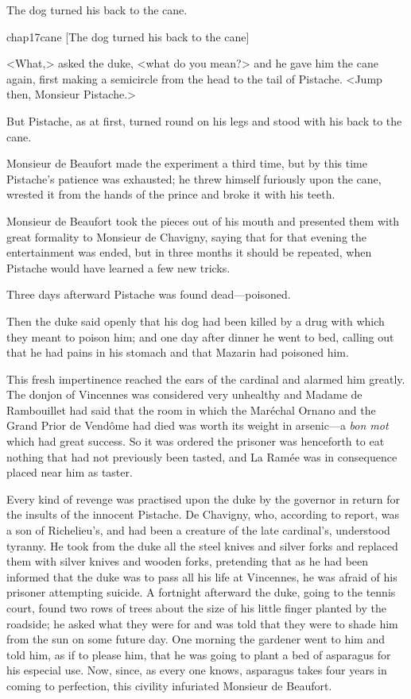 The dog turned his back to the cane.

\begin{bwbigpic}
	[\basicscale] 
	{chap17cane}
	[The dog turned his back to the cane]
\end{bwbigpic}

<What,> asked the duke, <what do you mean?> and he gave him the cane again, first making a semicircle from the head to the tail of Pistache. <Jump then, Monsieur Pistache.>

But Pistache, as at first, turned round on his legs and stood with his back to the cane.

Monsieur de Beaufort made the experiment a third time, but by this time Pistache's patience was exhausted; he threw himself furiously upon the cane, wrested it from the hands of the prince and broke it with his teeth.

Monsieur de Beaufort took the pieces out of his mouth and presented them with great formality to Monsieur de Chavigny, saying that for that evening the entertainment was ended, but in three months it should be repeated, when Pistache would have learned a few new tricks.

Three days afterward Pistache was found dead—poisoned.

Then the duke said openly that his dog had been killed by a drug with which they meant to poison him; and one day after dinner he went to bed, calling out that he had pains in his stomach and that Mazarin had poisoned him.

This fresh impertinence reached the ears of the cardinal and alarmed him greatly. The donjon of Vincennes was considered very unhealthy and Madame de Rambouillet had said that the room in which the Maréchal Ornano and the Grand Prior de Vendôme had died was worth its weight in arsenic—a \textit{bon mot} which had great success. So it was ordered the prisoner was henceforth to eat nothing that had not previously been tasted, and La Ramée was in consequence placed near him as taster.

Every kind of revenge was practised upon the duke by the governor in return for the insults of the innocent Pistache. De Chavigny, who, according to report, was a son of Richelieu's, and had been a creature of the late cardinal's, understood tyranny. He took from the duke all the steel knives and silver forks and replaced them with silver knives and wooden forks, pretending that as he had been informed that the duke was to pass all his life at Vincennes, he was afraid of his prisoner attempting suicide. A fortnight afterward the duke, going to the tennis court, found two rows of trees about the size of his little finger planted by the roadside; he asked what they were for and was told that they were to shade him from the sun on some future day. One morning the gardener went to him and told him, as if to please him, that he was going to plant a bed of asparagus for his especial use. Now, since, as every one knows, asparagus takes four years in coming to perfection, this civility infuriated Monsieur de Beaufort.

